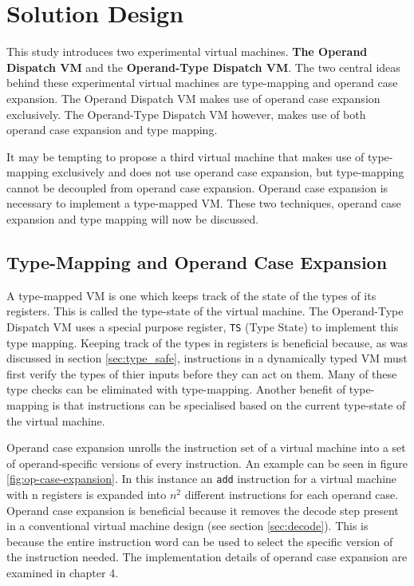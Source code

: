 \documentclass[english,a4paper,12pt]{report}
\begin{document}
\chapter{Solution Design}
This study introduces two experimental virtual machines. \textbf{The
  Operand Dispatch VM} and the \textbf{Operand-Type Dispatch VM}. The
two central ideas behind these experimental virtual machines are
type-mapping and operand case expansion. The Operand Dispatch VM makes
use of operand case expansion exclusively. The Operand-Type Dispatch
VM however, makes use of both operand case expansion and type
mapping. 

It may be tempting to propose a third virtual machine that makes use
of type-mapping exclusively and does not use operand case expansion,
but type-mapping cannot be decoupled from operand case
expansion. Operand case expansion is necessary to implement a
type-mapped VM. These two techniques, operand case expansion and type
mapping will now be discussed.


\section{Type-Mapping and Operand Case Expansion}
\label{sec:type-mapping-op-case-exp}
A type-mapped VM is one which keeps track of the state of the types of
its registers. This is called the type-state of the virtual machine.
The Operand-Type Dispatch VM uses a special purpose register,
\verb|TS| (Type State) to implement this type mapping. Keeping track
of the types in registers is beneficial because, as was discussed in
section \ref{sec:type_safe}, instructions in a dynamically typed VM
must first verify the types of thier inputs before they can act on
them. Many of these type checks can be eliminated with
type-mapping. Another benefit of type-mapping is that instructions can
be specialised based on the current type-state of the virtual machine.

Operand case expansion unrolls the instruction set of a virtual
machine into a set of operand-specific versions of every
instruction. An example can be seen in figure
\ref{fig:op-case-expansion}. In this instance an \verb|add|
instruction for a virtual machine with n registers is expanded into
$n^2$ different instructions for each operand case. Operand case
expansion is beneficial because it removes the decode step present in
a conventional virtual machine design (see section
\ref{sec:decode}). This is because the entire instruction word can be
used to select the specific version of the instruction needed. The
implementation details of operand case expansion are examined in chapter 4. 
\end{document}
